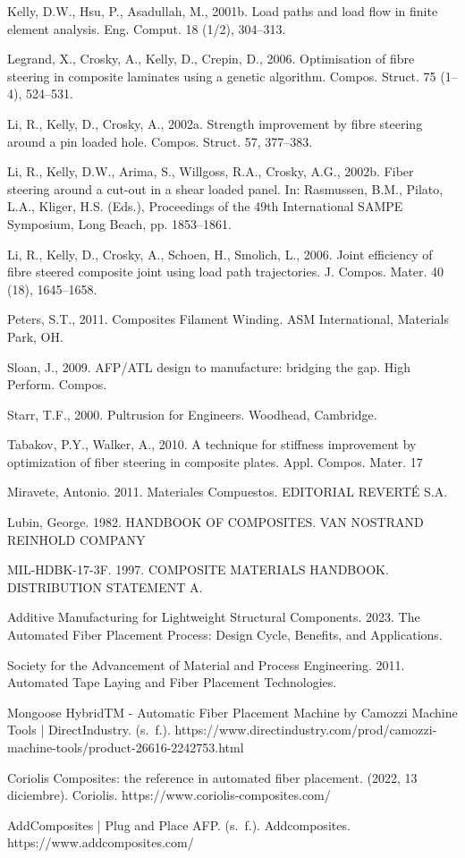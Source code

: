 Kelly, D.W., Hsu, P., Asadullah, M., 2001b. Load paths and load flow in finite element analysis. Eng. Comput. 18 (1/2), 304–313.

Legrand, X., Crosky, A., Kelly, D., Crepin, D., 2006. Optimisation of fibre steering in composite laminates using a genetic algorithm. Compos. Struct. 75 (1–4), 524–531.

Li, R., Kelly, D., Crosky, A., 2002a. Strength improvement by fibre steering around a pin loaded hole. Compos. Struct. 57, 377–383.

Li, R., Kelly, D.W., Arima, S., Willgoss, R.A., Crosky, A.G., 2002b. Fiber steering around a cut-out in a shear loaded panel. In: Rasmussen, B.M., Pilato, L.A., Kliger, H.S. (Eds.), Proceedings of the 49th International SAMPE Symposium, Long Beach, pp. 1853–1861.

Li, R., Kelly, D., Crosky, A., Schoen, H., Smolich, L., 2006. Joint efficiency of fibre steered composite joint using load path trajectories. J. Compos. Mater. 40 (18), 1645–1658.

Peters, S.T., 2011. Composites Filament Winding. ASM International, Materials Park, OH.

Sloan, J., 2009. AFP/ATL design to manufacture: bridging the gap. High Perform. Compos.

Starr, T.F., 2000. Pultrusion for Engineers. Woodhead, Cambridge.

Tabakov, P.Y., Walker, A., 2010. A technique for stiffness improvement by optimization of fiber steering in composite plates. Appl. Compos. Mater. 17

Miravete, Antonio. 2011. Materiales Compuestos. EDITORIAL REVERTÉ S.A.

Lubin, George. 1982. HANDBOOK OF COMPOSITES. VAN NOSTRAND REINHOLD COMPANY

MIL-HDBK-17-3F. 1997. COMPOSITE MATERIALS HANDBOOK. DISTRIBUTION STATEMENT A.

Additive Manufacturing for Lightweight Structural Components. 2023. The Automated Fiber Placement Process: Design Cycle, Benefits, and Applications. 

Society for the Advancement of Material and Process Engineering. 2011. Automated Tape Laying and Fiber Placement Technologies.

Mongoose HybridTM - Automatic Fiber Placement Machine by Camozzi Machine Tools | DirectIndustry. (s. f.). https://www.directindustry.com/prod/camozzi-machine-tools/product-26616-2242753.html

Coriolis Composites: the reference in automated fiber placement. (2022, 13 diciembre). Coriolis. https://www.coriolis-composites.com/

AddComposites | Plug and Place AFP. (s. f.). Addcomposites. https://www.addcomposites.com/
\textbf{}
